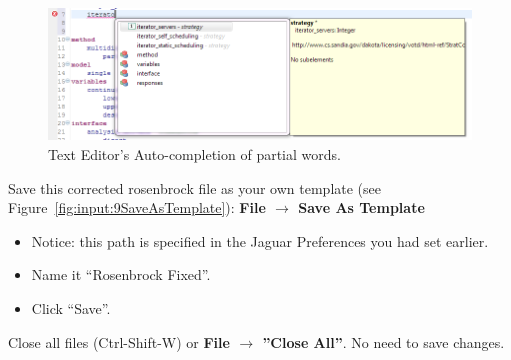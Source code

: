 \begin{figure}[htbp]
  \centering
  \includegraphics[scale=0.6]{images/8iterato}
  \caption{Text Editor's Auto-completion of partial words.}
  \label{fig:input:8iterato}
\end{figure}


Save this corrected rosenbrock file as your own template (see
Figure~\ref{fig:input:9SaveAsTemplate}): {\bf File $\rightarrow$ Save
  As Template}
\begin{itemize}
\item Notice: this path is specified in the Jaguar Preferences you had
  set earlier.
\item Name it ``Rosenbrock Fixed''.
\item Click ``Save''.
\end{itemize} 

Close all files (Ctrl-Shift-W) or {\bf File $\rightarrow$ ''Close
  All''}. No need to save changes.


